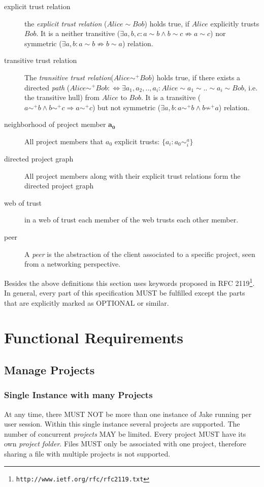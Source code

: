 \begin{description}
\item[explicit trust relation] the \emph{explicit trust relation} ($Alice \sim Bob$) holds true, if $Alice$ explicitly trusts $Bob$. It is a neither transitive ($\exists a, b, c: a \sim b \wedge b \sim c \not\Rightarrow a \sim c$) nor symmetric ($\exists a, b: a \sim b \not\Rightarrow b \sim a$) relation. 
\item[transitive trust relation] The \emph{transitive trust relation}($Alice \sim ^+ Bob$) holds true, if there exists a directed \emph{path} ($Alice \sim ^+ Bob : \Leftrightarrow \exists a_1, a_2, .., a_i: Alice \sim a_1 \sim ..\sim a_i \sim Bob$, i.e. the transitive hull) from $Alice$ to $Bob$. It is a transitive ($a \sim ^+ b \wedge b \sim ^+ c \Rightarrow a \sim ^+ c$) but not symmetric ($\exists a, b: a \sim ^+ b \wedge b \not\sim ^+ a$) relation. 
\item[neighborhood of project member $\mathbf{a_0}$] All project members that $a_0$ explicit trusts: $\{a_i: a_0 \sim ^ a_i\}$
\item[directed project graph] All project members along with their explicit trust relations form the directed project graph
\item[web of trust] in a web of trust each member of the web trusts each other member.
\item[peer] A \emph{peer} is the abstraction of the client associated to a specific project, seen from a networking perspective.
\end{description}

Besides the above definitions this section uses keywords proposed in RFC 2119\footnote{\texttt{http://www.ietf.org/rfc/rfc2119.txt}}. In general, every part of this specification MUST be fulfilled except the parts that are explicitly marked as OPTIONAL or similar.

\section{Functional Requirements}

\subsection{Manage Projects}
\subsubsection{Single Instance with many Projects}
At any time, there MUST NOT be more than one instance of Jake running per user session. Within this single instance several projects are supported. The number of concurrent \emph{projects} MAY be limited. Every project MUST have its own \emph{project folder}. Files MUST only be associated with one project, therefore sharing a file with multiple projects is not supported.

